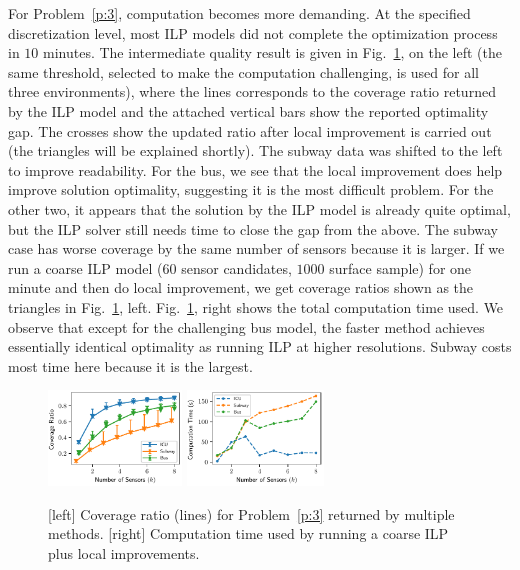 For Problem~\ref{p:3}, computation becomes more demanding. At the specified 
discretization level, most ILP models did not complete the optimization process 
in $10$ minutes. The intermediate quality result is given in Fig.~\ref{fig:computation-time-3}, on the left (the same threshold, selected to make the computation challenging, is used for all three environments), where the lines 
corresponds to the coverage ratio returned by the ILP model and the attached vertical bars show the reported optimality gap. The crosses show the updated ratio after local improvement is carried out (the triangles will be explained shortly). 
The subway data was shifted to the left to improve readability.
For the bus, we see that the local improvement does help improve solution optimality, suggesting it is the most difficult problem. For the other two, it appears that the solution by the ILP model is already quite optimal, but the ILP solver still needs time to close the gap from the above. The subway case has worse coverage by the same number of sensors because it is larger. If we run a coarse ILP model ($60$ sensor candidates, $1000$ surface sample) for one minute and then do local improvement, we get coverage ratios shown as the triangles in Fig.~\ref{fig:computation-time-3}, left. Fig.~\ref{fig:computation-time-3}, right shows the total computation time used. We observe that except for the challenging bus model, the faster method achieves essentially identical optimality as running ILP at higher resolutions. Subway costs most time here because it is the largest. 

\begin{figure}[!ht]
    \centering
    \includegraphics[width=.48\columnwidth, height=1in]{chapters/surf/fig/result-coverage-ratio-3-eps-converted-to.pdf}
    \includegraphics[width=.48\columnwidth, height=1in]{chapters/surf/fig/result-time-3-coarse-eps-converted-to.pdf}
    \caption{[left] Coverage ratio (lines) for Problem~\ref{p:3} returned by multiple methods. [right] Computation time used by running a coarse ILP plus local improvements.}
    \label{fig:computation-time-3}
\end{figure}

